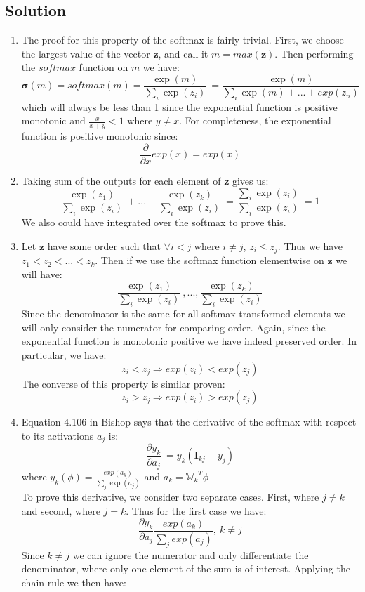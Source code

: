 \documentclass[submit]{harvardml}
\begin{document}
\subsection*{Solution}

\begin{enumerate}
	\item The proof for this property of the softmax is fairly trivial. First, we choose the largest value of the vector $\mathbf{z}$, and call it $m=max(\mathbf{z})$. Then performing the $softmax$ function on $m$ we have:
		\[ \bm{\sigma}(m) = softmax(m) =
		\frac{\exp(m)}{\sum_i\exp(z_i)}\ =
		\frac{\exp(m)}{\sum_i\exp(m)+...+exp(z_n)}\]
	which will always be less than 1 since the exponential function is positive monotonic and $\frac{x}{x+y}<1$ where $y \neq x$. For completeness, the exponential function is positive monotonic since:
		\[\frac{\partial}{\partial x} exp(x) = exp(x)\]
	\item Taking sum of the outputs for each element of $\mathbf{z}$ gives us:
		 \[\frac{\exp(z_1)}{\sum_i\exp(z_i)}\ + ... +
		 \frac{\exp(z_k)}{\sum_i\exp(z_i)}\ =
		 \frac{\sum_i\exp(z_i)}{\sum_i\exp(z_i)}\ = 
		 1\]
	We also could have integrated over the softmax to prove this.
	\item Let  $\mathbf{z}$ have some order such that $\forall i<j$ where $i \neq j$, $z_i \leq z_j$. Thus we have $z_1<z_2<...<z_k$. Then if we use the softmax function elementwise on $\mathbf{z}$ we will have:
		 \[\frac{\exp(z_1)}{\sum_i\exp(z_i)}\ , ... ,
		 \frac{\exp(z_k)}{\sum_i\exp(z_i)}\]
	Since the denominator is the same for all softmax transformed elements we will only consider the numerator for comparing order. Again, since the exponential function is monotonic positive we have indeed preserved order. In particular, we have:
		\[z_i<z_j \Rightarrow exp(z_i) < exp(z_j)\]
	The converse of this property is similar proven:
		\[z_i>z_j \Rightarrow exp(z_i) > exp(z_j)\]
	\item Equation 4.106 in Bishop says that the derivative of the softmax with respect to its activations $a_j$ is:
		\[\frac{\partial y_k}{\partial a_j}\ =
		y_k (\mathbf{I}_{kj} - y_j) 
		\]
	where $y_k (\phi) = \frac{exp(a_k)}{\sum_j\exp(a_j)}$ and $a_k = {\mathbb{W}_k}^T\phi$ \\
	To prove this derivative, we consider two separate cases. First, where $j \neq k$ and second, where $j = k$. Thus for the first case we have:
		\[
		\frac{\partial y_k}{\partial a_j} \frac{exp(a_k)}{\sum_j exp(a_j)}, \
		k \neq j
		\]
	Since $k \neq j$ we can ignore the numerator and only differentiate the denominator, where only one element of the sum is of interest. Applying the chain rule we then have:

\end{enumerate}
\end{document}
